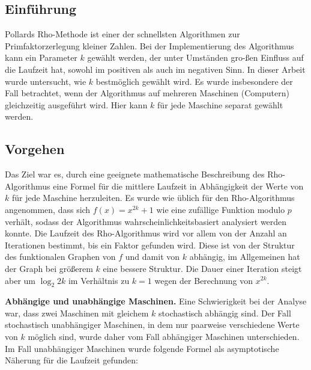 \documentclass[a4paper, extrafontsizes, ngerman, 25pt]{memoir}
\begin{document}
\subsection{Einführung}

Pollards Rho-Methode ist einer der schnellsten Algorithmen zur Primfaktorzerlegung kleiner Zahlen. Bei der Implementierung des Algorithmus kann ein Parameter $k$ gewählt werden, der unter Umständen gro-ßen Einfluss auf die Laufzeit hat, sowohl im positiven als auch im negativen Sinn. In dieser Arbeit wurde untersucht, wie $k$ bestmöglich gewählt wird. Es wurde insbesondere der Fall betrachtet, wenn der Algorithmus auf mehreren Maschinen (Computern) gleichzeitig ausgeführt wird. Hier kann $k$ für jede Maschine separat gewählt werden.

\newpage

\subsection{Vorgehen}

Das Ziel war es, durch eine geeignete mathematische Beschreibung des Rho-Algorithmus eine Formel für die mittlere Laufzeit in Abhängigkeit der Werte von $k$ für jede Maschine herzuleiten. Es wurde wie üblich für den Rho-Algorithmus angenommen, dass sich $f(x) = x^{2k} + 1$ wie eine zufällige Funktion modulo $p$ verhält, sodass der Algorithmus wahrscheinlichkeitsbasiert analysiert werden konnte. Die Laufzeit des Rho-Algorithmus wird vor allem von der Anzahl an Iterationen bestimmt, bis ein Faktor gefunden wird. Diese ist von der Struktur des funktionalen Graphen von $f$ und damit von $k$ abhängig, im Allgemeinen hat der Graph bei größerem $k$ eine bessere Struktur. Die Dauer einer Iteration steigt aber um $\log_2 2k$ im Verhältnis zu $k = 1$ wegen der Berechnung von $x^{2k}$.

\vspace{0.5cm}
\noindent \textbf{Abhängige und unabhängige Maschinen.} Eine Schwierigkeit bei der Analyse war, dass zwei Maschinen mit gleichem $k$ stochastisch abhängig sind. Der Fall stochastisch unabhängiger Maschinen, in dem nur paarweise verschiedene Werte von $k$ möglich sind, wurde daher vom Fall abhängiger Maschinen unterschieden. Im Fall unabhängiger Maschinen wurde folgende Formel als asymptotische Näherung für die Laufzeit gefunden:

\begin{figure}[H]
    \hspace{2.4cm} 
\end{figure}
\end{document}
